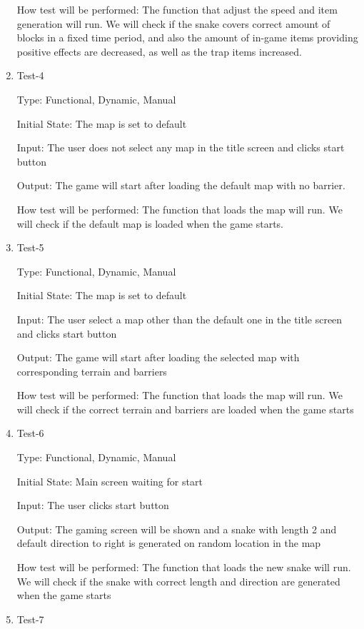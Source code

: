 \documentclass[12pt, titlepage]{article}
\begin{document}
\begin{enumerate}
How test will be performed: The function that adjust the speed and item generation will run. We will check if the snake covers correct amount of blocks in a fixed time period, and also the amount of in-game items providing positive effects are decreased, as well as the trap items increased.

\item{Test-4\\}

Type: Functional, Dynamic, Manual

Initial State: The map is set to default

Input: The user does not select any map in the title screen and clicks start button

Output: The game will start after loading the default map with no barrier.

How test will be performed: The function that loads the map will run. We will check if the default map is loaded when the game starts.

\item{Test-5\\}

Type: Functional, Dynamic, Manual

Initial State: The map is set to default

Input: The user select a map other than the default one in the title screen and clicks start button

Output: The game will start after loading the selected map with corresponding terrain and barriers

How test will be performed: The function that loads the map will run. We will check if the correct terrain and barriers are loaded when the game starts

\item{Test-6\\}

Type: Functional, Dynamic, Manual

Initial State: Main screen waiting for start

Input: The user clicks start button

Output: The gaming screen will be shown and a snake with length 2 and default direction to right is generated on random location in the map

How test will be performed: The function that loads the new snake will run. We will check if the snake with correct length and direction are generated when the game starts

\item{Test-7\\}


\end{enumerate}
\end{document}

